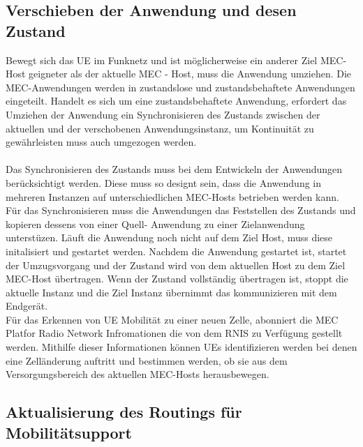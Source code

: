 \documentclass[runningheads]{llncs}
\numberwithin{figure}{section}
\begin{document}
\subsection{Verschieben der Anwendung und desen Zustand}
Bewegt sich das UE im Funknetz und ist möglicherweise ein anderer Ziel MEC-Host geigneter als der aktuelle
MEC - Host, muss die Anwendung umziehen. Die MEC-Anwendungen werden in zustandslose und zustandsbehaftete Anwendungen eingeteilt.
Handelt es sich um eine zustandsbehaftete Anwendung, 
erfordert das Umziehen der Anwendung ein Synchronisieren des Zustands zwischen der aktuellen und der
verschobenen Anwendungsinstanz, um Kontinuität zu gewährleisten
muss auch umgezogen werden. 
\\
\\
Das Synchronisieren des Zustands muss bei dem Entwickeln der Anwendungen berücksichtigt werden. Diese muss so designt sein, 
dass die Anwendung in mehreren Instanzen auf unterschiedlichen MEC-Hosts betrieben werden kann. 
Für das Synchronisieren muss die Anwendungen das Feststellen des Zustands und kopieren dessens von einer Quell- Anwendung 
zu einer Zielanwendung unterstüzen. 
Läuft die Anwendung noch nicht auf dem Ziel Host, muss diese initalisiert und gestartet werden.
Nachdem die Anwendung gestartet ist, startet der Umzugsvorgang und der Zustand wird von dem aktuellen 
Host zu dem Ziel MEC-Host übertragen. Wenn der Zustand vollständig übertragen ist, stoppt die aktuelle Instanz
und die Ziel Instanz übernimmt das kommunizieren mit dem Endgerät.
\\
Für das Erkennen von UE Mobilität zu einer neuen Zelle, abonniert die MEC Platfor Radio Network Infromationen die von dem RNIS zu
Verfügung gestellt werden. Mithilfe dieser Informationen können UEs identifizieren werden bei denen eine Zelländerung auftritt 
und bestimmen werden, ob sie aus dem Versorgungsbereich des aktuellen MEC-Hosts herausbewegen.
\subsection{Aktualisierung des Routings für Mobilitätsupport}
\end{document}
